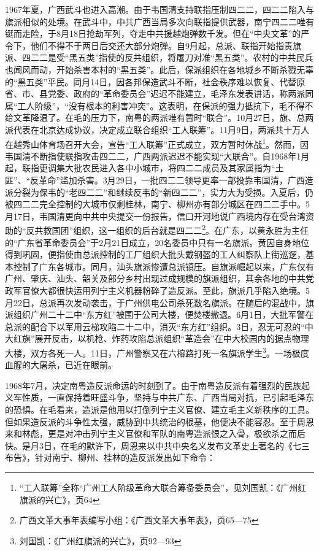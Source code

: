 1967年夏，广西武斗也进入高潮。由于韦国清支持联指压制四二二，四二二陷入与旗派相似的处境。在武斗中，中共广西当局多次向联指提供武器，南宁四二二唯有铤而走险，于8月18日抢劫军列，夺走中共援越炮弹数千发。但在“中央文革”的严令下，他们不得不于两日后交还大部分炮弹。自9月起，总派、联指开始指责旗派、四二二是受“黑五类”指使的反共组织，将屠刀对准“黑五类”。农村的中共民兵也闻风而动，开始杀害本村的“黑五类”。此后，保派组织在各地城乡不断杀戮无辜的“黑五类”平民。同月14日，因各邦保造武斗不断，社会秩序难以恢复、代替原省、市、县党委、政府的“革命委员会”迟迟不能建立，毛泽东发表讲话，称两派同属“工人阶级”，“没有根本的利害冲突”。这表明，在保派的强力抵抗下，毛不得不给文革降温了。在毛的压力下，南粤的两派唯有暂时“联合”。10月27日，旗、总两派代表在北京达成协议，决定成立联合组织“工人联筹”。11月9日，两派共十万人在越秀山体育场召开大会，宣告“工人联筹”正式成立，双方暂时休战\footnote{“工人联筹”全称“广州工人阶级革命大联合筹备委员会”，见刘国凯：《广州红旗派的兴亡》，页64}。然而，因韦国清不断指使联指攻击四二二，广西两派迟迟不能实现“大联合”。自1968年1月起，联指更调集大批农民进入各中小城市，将四二二成员及其家属指为“土匪”、“反革命”滥加杀害。3月29日，一批四二二领导更率一部投靠韦国清，广西造派分裂为保韦的“老四二二”和继续反韦的“新四二二”，实力大为受损。入夏后，仍被四二二完全控制的大城市仅剩桂林，南宁、柳州亦有部分城区在四二二手中。5月17日，韦国清更向中共中央提交一份报告，信口开河地说广西境内存在受台湾资助的“反共救国团”组织，这一组织的后台就是四二二\footnote{广西文革大事年表编写小组：《广西文革大事年表》，页65—75}。在广东，以黄永胜为主任的“广东省革命委员会”于2月21日成立，20名委员中只有一名旗派。黄因自身地位得到巩固，便指使由总派控制的工厂组织大批头戴钢盔的工人纠察队上街巡逻，基本控制了广东各城市。同月，汕头旗派惨遭总派镇压。自旗派崛起以来，广东仅有广州、肇庆、汕头、韶关及部分乡村出现过成规模的旗派组织，其余各地的中共党政军官僚大都很快运用列宁主义机器粉碎了造反派。至此，旗派几乎陷入绝境。5月22日，总派再次发动袭击，于广州供电公司杀死数名旗派。在随后的混战中，旗派组织广州二十二中“东方红”被围于公司大楼，便焚楼撤退。6月1日，大批军警在总派的配合下以军用云梯攻陷二十二中，消灭“东方红”组织。3日，忍无可忍的“中大红旗”展开反击，以机枪、炸药攻陷总派组织“革造会”在中大校园内的据点物理大楼，双方各死一人。11日，广州警察又在六榕路打死一名旗派学生\footnote{刘国凯：《广州红旗派的兴亡》，页92—93}。一场极度血腥的大屠杀，已近在眼前。

1968年7月，决定南粤造反派命运的时刻到了。由于南粤造反派有着强烈的民族起义军性质，一直保持着旺盛斗争，坚持与中共广东、广西当局对抗，已引起毛泽东的恐惧。在毛看来，造派是他用以打倒列宁主义官僚、建立毛主义新秩序的工具。但如果造反派的斗争性太强，威胁到中共统治的根基，他便决不能容忍。至于周恩来和林彪，更是对冲击列宁主义官僚和军队的南粤造派恨之入骨，极欲杀之而后快。是月3日，在毛的默许下，周恩来以中共中央名义发布文革史上著名的《七三布告》，针对南宁、柳州、桂林的造反派发出如下命令：

